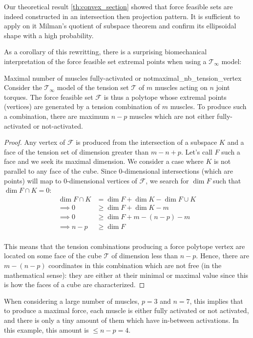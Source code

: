 Our theoretical result \ref{th:convex_section} showed that force feasible sets are indeed constructed in an intersection then projection pattern. It is sufficient to apply on it Milman's quotient of subspace theorem and confirm its ellipsoidal shape with a high probability. 

As a corollary of this rewritting, there is a surprising biomechanical interpretation of the force feasible set extremal points when using a $\mathcal{T}_{\infty}$ model:
\begin{lemmabox}{Maximal number of muscles fully-activated or not}{maximal_nb_tension_vertex}
    Consider the $\mathcal{T}_{\infty}$ model of the tension set $\mathcal{T}$ of $m$ muscles acting on $n$ joint torques. The force feasible set $\mathcal{F}$ is thus a polytope whose extremal points (vertices) are generated by a tension combination of $m$ muscles. To produce such a combination, there are maximum $n-p$ muscles which are not either fully-activated or not-activated.
\end{lemmabox}
\begin{proof}
    Any vertex of $\mathcal{F}$ is produced from the intersection of a subspace $K$ and a face of the tension set of dimension greater than $m-n+p$. Let's call $F$ such a face and we seek its maximal dimension. We consider a case where $K$ is not parallel to any face of the cube. Since $0$-dimensional intersections (which are points) will map to $0$-dimensional vertices of $\mathcal{F}$, we search for $\dim F$ such that $\dim F\cap K = 0$:
    \begin{align*}
        \dim F\cap K & = \dim F + \dim K - \dim F\cup K \\
        \implies 0 &\geq \dim F + \dim K - m \\
        \implies 0 &\geq \dim F + m-(n-p) - m\\
        \implies n-p &\geq \dim F\\
    \end{align*}

    This means that the tension combinations producing a force polytope vertex are located on some face of the cube $\mathcal{T}$ of dimension less than $n-p$. Hence, there are $m-(n-p)$ coordinates in this combination which are not free (in the mathematical sense): they are either at their minimal or maximal value since this is how the faces of a cube are characterized.
\end{proof}

When considering a large number of muscles, $p=3$ and $n=7$, this implies that to produce a maximal force, each muscle is either fully activated or not activated, and there is only a tiny amount of them which have in-between activations. In this example, this amount is $\leq n-p=4$.

